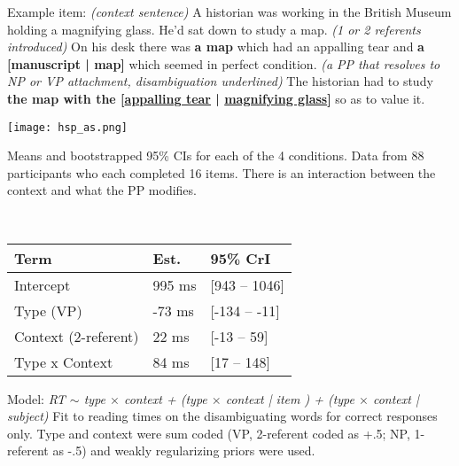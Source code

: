\documentclass[11pt,a4paper]{article}
\begin{document}
	\begin{minipage}{\textwidth}
		\begin{small}
			Example item:  \textit{(context sentence)} A historian was working in the British Museum holding a magnifying glass. He'd sat down to study  a map. 
			\textit{(1 or 2 referents introduced)} On his desk there was \textbf{a map} which had an appalling tear and \textbf{a  {[manuscript | map]}} which seemed in perfect condition. \textit{(a PP that resolves to NP or VP attachment, disambiguation underlined)} The historian had to study \textbf{the map with the {[\uline{appalling  tear} | 
					\uline{magnifying glass}]}} so as to value it.
				
		\end{small} 
		\medskip
	\end{minipage}
	
	\begin{minipage}{.5\textwidth}
		{	\texttt{[image: hsp\_as.png]}} 
		\begin{small}
			Means and bootstrapped 95\% CIs for each of the 4 conditions. Data from 88 participants who each completed 16 items. There is an interaction between the context and what the PP modifies. 
			
		\end{small}
		
	\end{minipage}
	~~
	\begin{minipage}{.45\textwidth}
		\begin{small}
			\begin{tabular}{|l|l|l|}
				\hline
				Term & Est. & 95\% CrI \\
				\hline
				Intercept & 995 ms & [943 -- 1046] \\
				Type (VP) & -73 ms & [-134 -- -11] \\
				Context (2-referent) & 22 ms & [-13 -- 59] \\
				Type x Context & 84 ms  & [17 -- 148] \\
				\hline
			\end{tabular}
			\vspace{2pt}
			
			Model: \textit{RT $\sim$ type $\times$ context + (type $\times$ context | item ) + (type $\times$ context | subject) } 
			Fit to reading times on the disambiguating words for correct responses only. Type and context were sum coded (VP, 2-referent coded as +.5; NP, 1-referent as -.5) and weakly regularizing priors were used. 
			
		\end{small}
		
	\end{minipage}
	
\end{document}
